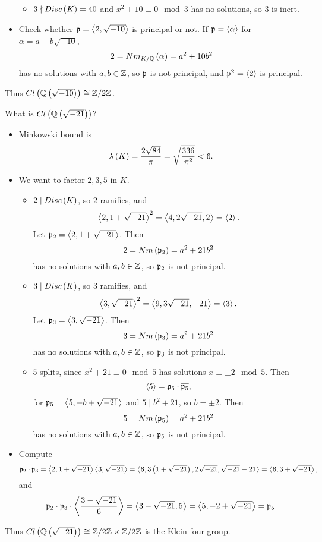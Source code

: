 \begin{example*}
\begin{itemize}
\begin{itemize}
\item $ 3 \nmid Disc\left( K \right) = 40 $ and $ x^2 + 10 \equiv 0 \mod 3 $ has no solutions, so $ 3 $ is inert.
\end{itemize}
\item Check whether $ \mathfrak{p} = \left\langle 2, \sqrt{-10} \right\rangle $ is principal or not. If $ \mathfrak{p} = \left\langle \alpha \right\rangle $ for $ \alpha = a + b\sqrt{-10} $,
$$ 2 = Nm_{K / \mathbb{Q}}\left( \alpha \right) = a^2 + 10b^2 $$
has no solutions with $ a, b \in \mathbb{Z} $, so $ \mathfrak{p} $ is not principal, and $ \mathfrak{p}^2 = \left\langle 2 \right\rangle $ is principal.
\end{itemize}
Thus $ Cl\left( \mathbb{Q}\left( \sqrt{-10} \right) \right) \cong \mathbb{Z} / 2\mathbb{Z} $.
\end{example*}

\pagebreak

\begin{example*}
What is $ Cl\left( \mathbb{Q}\left( \sqrt{-21} \right) \right) $?
\begin{itemize}
\item Minkowski bound is
$$ \lambda\left( K \right) = \dfrac{2\sqrt{84}}{\pi} = \sqrt{\dfrac{336}{\pi^2}} < 6. $$
\item We want to factor $ 2, 3, 5 $ in $ K $.
\begin{itemize}
\item $ 2 \mid Disc\left( K \right) $, so $ 2 $ ramifies, and
$$ \left\langle 2, 1 + \sqrt{-21} \right\rangle^2 = \left\langle 4, 2\sqrt{-21}, 2 \right\rangle = \left\langle 2 \right\rangle. $$
Let $ \mathfrak{p}_2 = \left\langle 2, 1 + \sqrt{-21} \right\rangle $. Then
$$ 2 = Nm\left( \mathfrak{p}_2 \right) = a^2 + 21b^2 $$
has no solutions with $ a, b \in \mathbb{Z} $, so $ \mathfrak{p}_2 $ is not principal.
\item $ 3 \mid Disc\left( K \right) $, so $ 3 $ ramifies, and
$$ \left\langle 3, \sqrt{-21} \right\rangle^2 = \left\langle 9, 3\sqrt{-21}, -21 \right\rangle = \left\langle 3 \right\rangle. $$
Let $ \mathfrak{p}_3 = \left\langle 3, \sqrt{-21} \right\rangle $. Then
$$ 3 = Nm\left( \mathfrak{p}_3 \right) = a^2 + 21b^2 $$
has no solutions with $ a, b \in \mathbb{Z} $, so $ \mathfrak{p}_3 $ is not principal.
\item $ 5 $ splits, since $ x^2 + 21 \equiv 0 \mod 5 $ has solutions $ x \equiv \pm 2 \mod 5 $. Then
$$ \left\langle 5 \right\rangle = \mathfrak{p}_5 \cdot \overline{\mathfrak{p}_5}, $$
for $ \mathfrak{p}_5 = \left\langle 5, -b + \sqrt{-21} \right\rangle $ and $ 5 \mid b^2 + 21 $, so $ b = \pm 2 $. Then
$$ 5 = Nm\left( \mathfrak{p}_5 \right) = a^2 + 21b^2 $$
has no solutions with $ a, b \in \mathbb{Z} $, so $ \mathfrak{p}_5 $ is not principal.
\end{itemize}
\item Compute
$$ \mathfrak{p}_2 \cdot \mathfrak{p}_3 = \left\langle 2, 1 + \sqrt{-21} \right\rangle\left\langle 3, \sqrt{-21} \right\rangle = \left\langle 6, 3\left( 1 + \sqrt{-21} \right), 2\sqrt{-21}, \sqrt{-21} - 21 \right\rangle = \left\langle 6, 3 + \sqrt{-21} \right\rangle, $$
and
$$ \mathfrak{p}_2 \cdot \mathfrak{p}_3 \cdot \left\langle \dfrac{3 - \sqrt{-21}}{6} \right\rangle = \left\langle 3 - \sqrt{-21}, 5 \right\rangle = \left\langle 5, -2 + \sqrt{-21} \right\rangle = \mathfrak{p}_5. $$
\end{itemize}
Thus $ Cl\left( \mathbb{Q}\left( \sqrt{-21} \right) \right) \cong \mathbb{Z} / 2\mathbb{Z} \times \mathbb{Z} / 2\mathbb{Z} $ is the Klein four group.
\end{example*}

